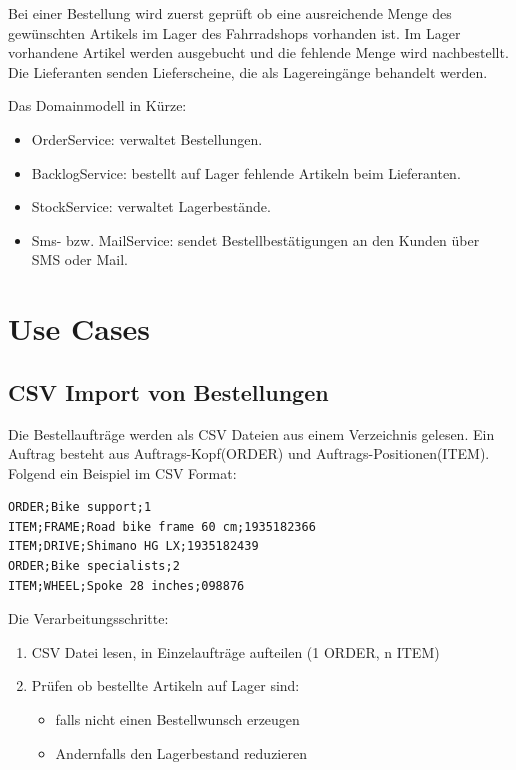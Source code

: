 \documentclass[12pt,a4paper,ngerman]{article}
\begin{document}
Bei einer Bestellung wird zuerst geprüft ob eine ausreichende Menge des
gewünschten Artikels im Lager des Fahrradshops vorhanden ist. Im Lager
vorhandene Artikel werden ausgebucht und die fehlende Menge wird
nachbestellt. Die Lieferanten senden Lieferscheine, die als
Lagereingänge behandelt werden.

Das Domainmodell in Kürze:

\begin{itemize}
\item
  OrderService: verwaltet Bestellungen.
\item
  BacklogService: bestellt auf Lager fehlende Artikeln beim Lieferanten.
\item
  StockService: verwaltet Lagerbestände.
\item
  Sms- bzw. MailService: sendet Bestellbestätigungen an den Kunden über
  SMS oder Mail.
\end{itemize}

\section{Use Cases}

\subsection{CSV Import von Bestellungen}

Die Bestellaufträge werden als CSV Dateien aus einem Verzeichnis
gelesen. Ein Auftrag besteht aus Auftrags-Kopf(ORDER) und
Auftrags-Positionen(ITEM). Folgend ein Beispiel im CSV Format:

\begin{lstlisting}
ORDER;Bike support;1
ITEM;FRAME;Road bike frame 60 cm;1935182366
ITEM;DRIVE;Shimano HG LX;1935182439
ORDER;Bike specialists;2
ITEM;WHEEL;Spoke 28 inches;098876
\end{lstlisting}

Die Verarbeitungsschritte:

\begin{enumerate}[1.]
\item
  CSV Datei lesen, in Einzelaufträge aufteilen (1 ORDER, n ITEM)
\item
  Prüfen ob bestellte Artikeln auf Lager sind:

  \begin{itemize}
  \item
    falls nicht einen Bestellwunsch erzeugen
  \item
    Andernfalls den Lagerbestand reduzieren
  \end{itemize}
\end{enumerate}
\end{document}
